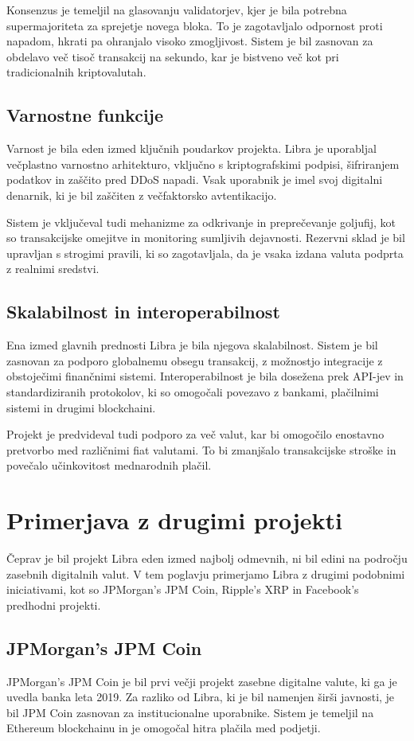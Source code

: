 \documentclass[12pt,a4paper]{article}
\begin{document}
Konsenzus je temeljil na glasovanju validatorjev, kjer je bila potrebna supermajoriteta za sprejetje novega bloka. To je zagotavljalo odpornost proti napadom, hkrati pa ohranjalo visoko zmogljivost. Sistem je bil zasnovan za obdelavo več tisoč transakcij na sekundo, kar je bistveno več kot pri tradicionalnih kriptovalutah.

\subsection{Varnostne funkcije}
Varnost je bila eden izmed ključnih poudarkov projekta. Libra je uporabljal večplastno varnostno arhitekturo, vključno s kriptografskimi podpisi, šifriranjem podatkov in zaščito pred DDoS napadi. Vsak uporabnik je imel svoj digitalni denarnik, ki je bil zaščiten z večfaktorsko avtentikacijo.

Sistem je vključeval tudi mehanizme za odkrivanje in preprečevanje goljufij, kot so transakcijske omejitve in monitoring sumljivih dejavnosti. Rezervni sklad je bil upravljan s strogimi pravili, ki so zagotavljala, da je vsaka izdana valuta podprta z realnimi sredstvi.

\subsection{Skalabilnost in interoperabilnost}
Ena izmed glavnih prednosti Libra je bila njegova skalabilnost. Sistem je bil zasnovan za podporo globalnemu obsegu transakcij, z možnostjo integracije z obstoječimi finančnimi sistemi. Interoperabilnost je bila dosežena prek API-jev in standardiziranih protokolov, ki so omogočali povezavo z bankami, plačilnimi sistemi in drugimi blockchaini.

Projekt je predvideval tudi podporo za več valut, kar bi omogočilo enostavno pretvorbo med različnimi fiat valutami. To bi zmanjšalo transakcijske stroške in povečalo učinkovitost mednarodnih plačil.

\section{Primerjava z drugimi projekti}

Čeprav je bil projekt Libra eden izmed najbolj odmevnih, ni bil edini na področju zasebnih digitalnih valut. V tem poglavju primerjamo Libra z drugimi podobnimi iniciativami, kot so JPMorgan's JPM Coin, Ripple's XRP in Facebook's predhodni projekti.

\subsection{JPMorgan's JPM Coin}
JPMorgan's JPM Coin je bil prvi večji projekt zasebne digitalne valute, ki ga je uvedla banka leta 2019. Za razliko od Libra, ki je bil namenjen širši javnosti, je bil JPM Coin zasnovan za institucionalne uporabnike. Sistem je temeljil na Ethereum blockchainu in je omogočal hitra plačila med podjetji.
\end{document}
